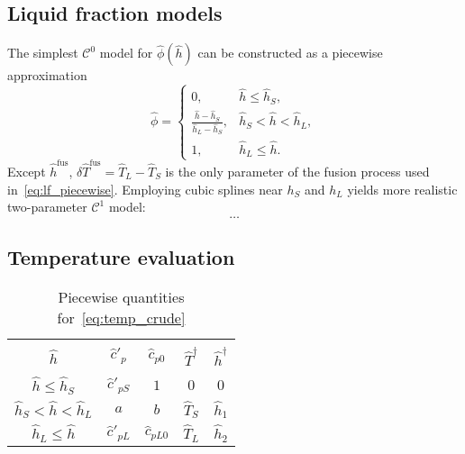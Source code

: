 \documentclass{article}
\newcommand{\fusion}[1]{{#1}^\mathrm{fus}}
\begin{document}

\subsection{Liquid fraction models}

The simplest \(\mathcal{C}^0\) model for \(\hat{\phi}(\hat{h})\) can be constructed as a piecewise approximation
\begin{equation}\label{eq:lf_piecewise}
	\hat{\phi} = \begin{cases}
        0,                                             & \hat{h} \leq \hat{h}_S, \\
        \frac{\hat{h}-\hat{h}_S}{\hat{h}_L-\hat{h}_S}, & \hat{h}_S < \hat{h} < \hat{h}_L, \\
        1,                                             & \hat{h}_L \leq \hat{h}.
    \end{cases}
\end{equation}
Except \(\fusion{\hat{h}}\), \(\delta\fusion{\hat{T}} = \hat{T}_L - \hat{T}_S\)
is the only parameter of the fusion process  used in~\eqref{eq:lf_piecewise}.
Employing cubic splines near \(h_S\) and \(h_L\) yields more realistic two-parameter \(\mathcal{C}^1\) model:
\begin{equation}\label{eq:lf_splines}
	\dots
\end{equation}

\subsection{Temperature evaluation}

\begin{table}
    \centering
    \caption{Piecewise quantities for~\eqref{eq:temp_crude}}
    \label{table:temp_params}
    \begin{tabular}{c|cccc}
        \hline\\[-1em]
        \(\hat{h}\)                         & \(\hat{c}'_p\)    & \(\hat{c}_{p0}\)  & \(\hat{T}^\dag\) & \(\hat{h}^\dag\) \\[0.3em]
        \hline\\[-1em]
        \(\hat{h} \leq \hat{h}_S\)          & \(\hat{c}'_{pS}\) & \(1\)             & \(0\)            & \(0\)            \\[0.3em]
        \(\hat{h}_S < \hat{h} < \hat{h}_L\) & \(a\)             & \(b\)             & \(\hat{T}_S\)    & \(\hat{h}_1\)    \\[0.3em]
        \(\hat{h}_L \leq \hat{h}\)          & \(\hat{c}'_{pL}\) & \(\hat{c}_{pL0}\) & \(\hat{T}_L\)    & \(\hat{h}_2\)    \\[0.3em]
        \hline
    \end{tabular}
\end{table}
\end{document}
